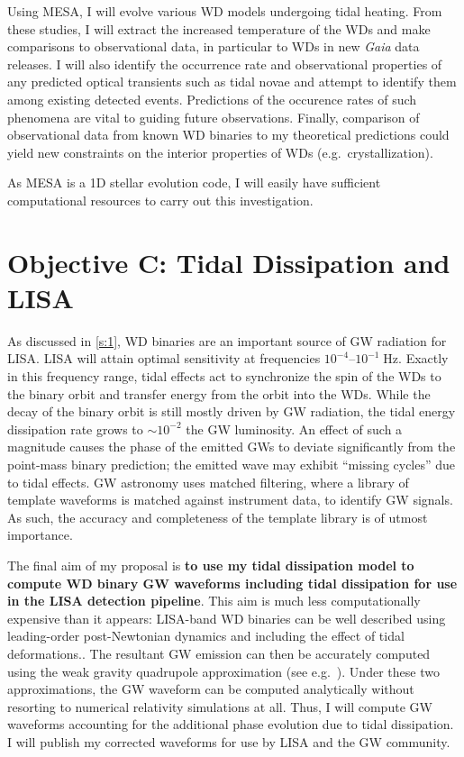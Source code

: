 \documentclass[12pt,
        usenames, %
        dvipsnames %
    ]{article}
\begin{document}
Using MESA, I will evolve various WD models undergoing tidal heating. From these
studies, I will extract the increased temperature of the WDs and make
comparisons to observational data, in particular to WDs in new \emph{Gaia} data
releases. I will also identify the occurrence rate and observational properties
of any predicted optical transients such as tidal novae and attempt to identify
them among existing detected events. Predictions of the occurence rates of such
phenomena are vital to guiding future observations. Finally, comparison of
observational data from known WD binaries to my theoretical predictions could
yield new constraints on the interior properties of WDs (e.g.\ crystallization).

As MESA is a 1D stellar evolution code, I will easily have sufficient
computational resources to carry out this investigation.

\section{Objective C\@: Tidal Dissipation and LISA}\label{s:4}

As discussed in \autoref{s:1}, WD binaries are an important source of GW
radiation for LISA\@. LISA will attain optimal sensitivity at frequencies
$10^{-4}$--$10^{-1}\;\mathrm{Hz}$\cite{LISA_band}. Exactly in this frequency
range, tidal effects act to synchronize the spin of the WDs to the binary orbit
and transfer energy from the orbit into the WDs. While the decay of the binary
orbit is still mostly driven by GW radiation, the tidal energy dissipation rate
grows to $\sim10^{-2}$ the GW luminosity\cite{fullerII,fullerIV}. An effect of
such a magnitude causes the phase of the emitted GWs to deviate significantly
from the point-mass binary prediction; the emitted wave may exhibit ``missing
cycles'' due to tidal effects\cite{fullerII}. GW astronomy uses matched
filtering, where a library of template waveforms is matched against instrument
data, to identify GW signals. As such, the accuracy and completeness of the
template library is of utmost importance.

The final aim of my proposal is \textbf{to use my tidal dissipation model to
compute WD binary GW waveforms including tidal dissipation for use in the LISA
detection pipeline}. This aim is much less computationally expensive than it
appears: LISA-band WD binaries can be well described using leading-order
post-Newtonian dynamics and including the effect of tidal
deformations.\cite{DWD_pointmass}. The resultant GW emission can then be
accurately computed using the weak gravity quadrupole approximation (see
e.g.~\cite{peters,lsst_wd}). Under these two approximations, the GW waveform can
be computed analytically without resorting to numerical relativity simulations
at all. Thus, I will compute GW waveforms accounting for the additional phase
evolution due to tidal dissipation. I will publish my corrected waveforms for
use by LISA and the GW community.
\end{document}

